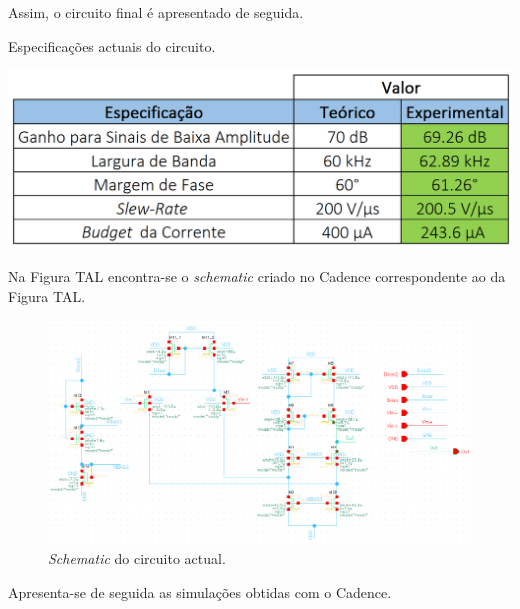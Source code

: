 \documentclass[11pt]{article}
\numberwithin{equation}{section}
\begin{document}

Assim, o circuito final é apresentado de seguida.


\begin{table}[H]
	\centering
	\caption{Especificações actuais do circuito.}
	\vspace{-1.5mm}
	\includegraphics[keepaspectratio=true, scale=0.40]{teoricas/tabsemarea}
\end{table}

Na Figura TAL encontra-se o \textit{schematic} criado no Cadence correspondente ao da Figura TAL.

\begin{figure}[H]
	\centering
	\includegraphics[keepaspectratio=true, scale=0.70]{exps/dimen_final}
	\vspace{-0.5em}
	\caption{\textit{Schematic} do circuito actual.}
	\vspace{-0.8em}
\end{figure} 

Apresenta-se de seguida as simulações obtidas com o Cadence.
\end{document}
